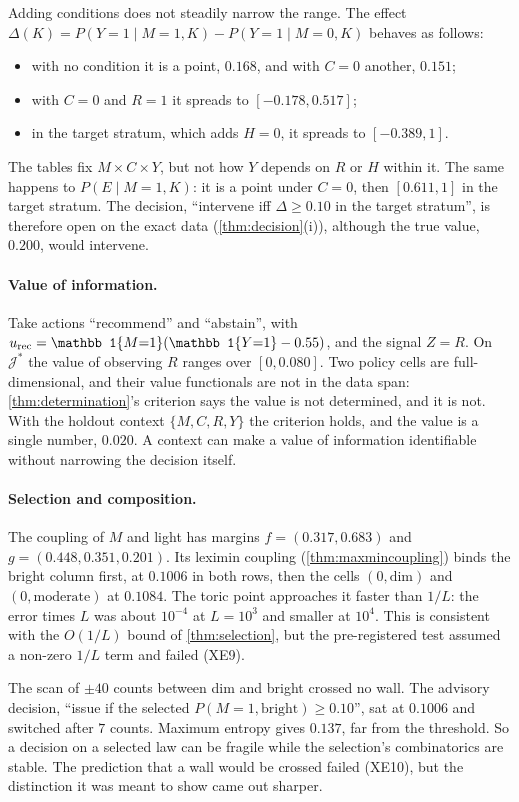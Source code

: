 \documentclass[11pt]{article}
\theoremstyle{definition}\newtheorem{definition}[theorem]{Definition}\newtheorem{remark}[theorem]{Remark}\newtheorem{example}[theorem]{Example}\newtheorem{problem}[theorem]{Open problem}\crefname{problem}{Problem}{Problems}
\begin{document}
Adding conditions does not steadily narrow the range. The effect $\Delta(K)=P(Y{=}1\mid M{=}1,K)-P(Y{=}1\mid M{=}0,K)$ behaves as follows:
\begin{itemize}
\item with no condition it is a point, $0.168$, and with $C=0$ another, $0.151$;
\item with $C=0$ and $R=1$ it spreads to $[-0.178,0.517]$;
\item in the target stratum, which adds $H=0$, it spreads to $[-0.389,1]$.
\end{itemize}
The tables fix $M\times C\times Y$, but not how $Y$ depends on $R$ or $H$ within it. The same happens to $P(E\mid M{=}1,K)$: it is a point under $C=0$, then $[0.611,1]$ in the target stratum. The decision, ``intervene iff $\Delta\ge0.10$ in the target stratum'', is therefore open on the exact data (\cref{thm:decision}(i)), although the true value, $0.200$, would intervene.

\paragraph{Value of information.} Take actions ``recommend'' and ``abstain'', with $u_{\rm rec}=\mathbb 1\{M{=}1\}(\mathbb 1\{Y{=}1\}-0.55)$, and the signal $Z=R$. On $\mathcal J^\ast$ the value of observing $R$ ranges over $[0,0.080]$. Two policy cells are full-dimensional, and their value functionals are not in the data span: \cref{thm:determination}'s criterion says the value is not determined, and it is not. With the holdout context $\{M,C,R,Y\}$ the criterion holds, and the value is a single number, $0.020$. A context can make a value of information identifiable without narrowing the decision itself.

\paragraph{Selection and composition.} The coupling of $M$ and light has margins $f=(0.317,0.683)$ and $g=(0.448,0.351,0.201)$. Its leximin coupling (\cref{thm:maxmincoupling}) binds the bright column first, at $0.1006$ in both rows, then the cells $(0,\text{dim})$ and $(0,\text{moderate})$ at $0.1084$. The toric point approaches it faster than $1/L$: the error times $L$ was about $10^{-4}$ at $L=10^3$ and smaller at $10^4$. This is consistent with the $O(1/L)$ bound of \cref{thm:selection}, but the pre-registered test assumed a non-zero $1/L$ term and failed (XE9).

The scan of $\pm40$ counts between dim and bright crossed no wall. The advisory decision, ``issue if the selected $P(M{=}1,\text{bright})\ge0.10$'', sat at $0.1006$ and switched after $7$ counts. Maximum entropy gives $0.137$, far from the threshold. So a decision on a selected law can be fragile while the selection's combinatorics are stable. The prediction that a wall would be crossed failed (XE10), but the distinction it was meant to show came out sharper.
\end{document}
